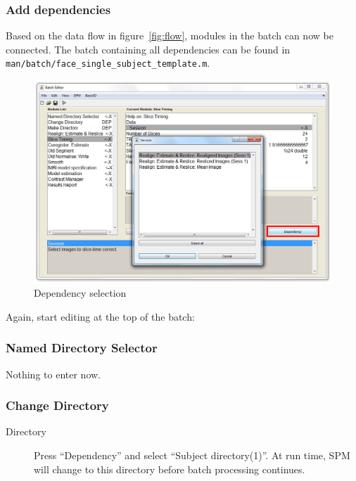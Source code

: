 \subsubsection{Add dependencies}

Based on the data flow in figure~\ref{fig:flow}, modules in the batch can now
be connected. The batch containing all dependencies can be found in
\verb|man/batch/face_single_subject_template.m|.

\begin{figure}[htbp]
  \centering
  \includegraphics[width=\textwidth]{batch/batch_dependencies}
  \caption{Dependency selection}
  \label{fig:batch_dependency}
\end{figure}

Again, start editing at the top of the batch:

\subsubsection*{Named Directory Selector}

Nothing to enter now.

\subsubsection*{Change Directory}

\begin{description}
\item[Directory] Press ``Dependency'' and select ``Subject
  directory(1)''. At run time, SPM will change to this directory before batch
  processing continues.
\end{description}

